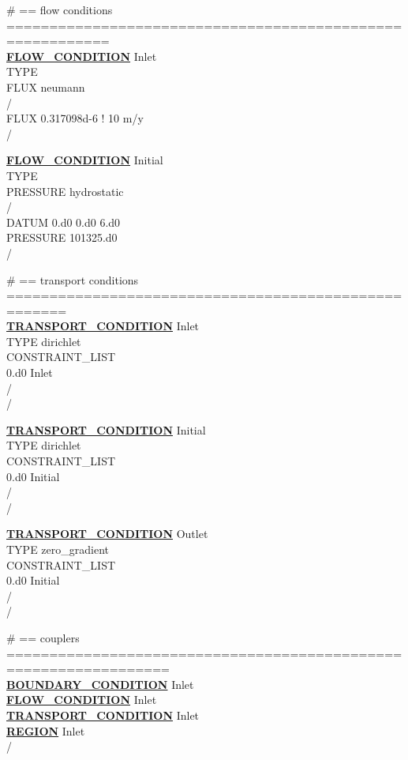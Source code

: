 \noindent
\# == flow conditions ==========================================================\\
\hyperlink{target_flow_cond}{\bf FLOW\_CONDITION} Inlet\\
TYPE\\
FLUX neumann\\
/\\
FLUX 0.317098d-6 ! 10 m/y\\
/

\noindent
\hyperlink{target_flow_cond}{\bf FLOW\_CONDITION} Initial\\
TYPE\\
PRESSURE hydrostatic\\
/\\
DATUM 0.d0 0.d0 6.d0\\
PRESSURE 101325.d0\\
/

\noindent
\# == transport conditions =====================================================\\
\hyperlink{target_trans_cond}{\bf TRANSPORT\_CONDITION} Inlet\\
TYPE dirichlet\\
CONSTRAINT\_LIST\\
0.d0 Inlet\\
/\\
/

\noindent
\hyperlink{target_trans_cond}{\bf TRANSPORT\_CONDITION} Initial\\
TYPE dirichlet\\
CONSTRAINT\_LIST\\
0.d0 Initial\\
/\\
/

\noindent
\hyperlink{target_trans_cond}{\bf TRANSPORT\_CONDITION} Outlet\\
TYPE zero\_gradient\\
CONSTRAINT\_LIST\\
0.d0 Initial\\
/\\
/

\noindent
\# == couplers =================================================================\\
\hyperlink{target_bcon}{\bf BOUNDARY\_CONDITION} Inlet\\
\hyperlink{target_flow_cond}{\bf FLOW\_CONDITION} Inlet\\
\hyperlink{target_trans_cond}{\bf TRANSPORT\_CONDITION} Inlet\\
\hyperlink{target_region}{\bf REGION} Inlet\\
/

